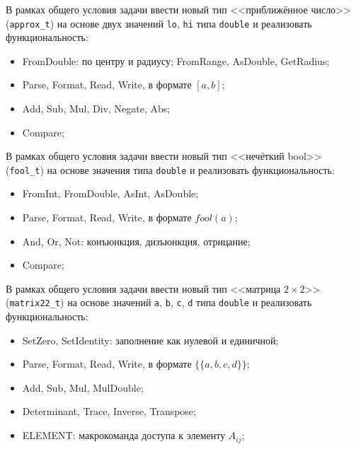 
\begin{zztask}
В рамках общего условия задачи ввести новый тип <<приближённое число>>
(\texttt{approx\_t}) на основе двух значений \texttt{lo}, \texttt{hi} типа
\texttt{double} и реализовать функциональность:
%
\begin{itemize}
\item FromDouble: по центру и радиусу; FromRange, AsDouble, GetRadius;
\item Parse, Format, Read, Write, в формате $[a, b]$;
\item Add, Sub, Mul, Div, Negate, Abs;
\item Compare;
\end{itemize}
\end{zztask}


\begin{zztask}
В рамках общего условия задачи ввести новый тип <<нечёткий bool>>
(\texttt{fool\_t}) на основе значения типа \texttt{double} и реализовать
функциональность:
%
\begin{itemize}
\item FromInt, FromDouble, AsInt, AsDouble;
\item Parse, Format, Read, Write, в формате $\mathit{fool}(a)$;
\item And, Or, Not: конъюнкция, дизъюнкция, отрицание;
\item Compare;
\end{itemize}
\end{zztask}


\begin{zztask}
В рамках общего условия задачи ввести новый тип <<матрица $2\times 2$>>
(\texttt{matrix22\_t}) на основе значений \texttt{a}, \texttt{b}, \texttt{c},
\texttt{d} типа \texttt{double} и реализовать функциональность:
%
\begin{itemize}
\item SetZero, SetIdentity: заполнение как нулевой и единичной;
\item Parse, Format, Read, Write, в формате $\{\{a,b,c,d\}\}$;
\item Add, Sub, Mul, MulDouble;
\item Determinant, Trace, Inverse, Transpose;
\item ELEMENT: макрокоманда доступа к элементу $A_{ij}$;
\end{itemize}
\end{zztask}

